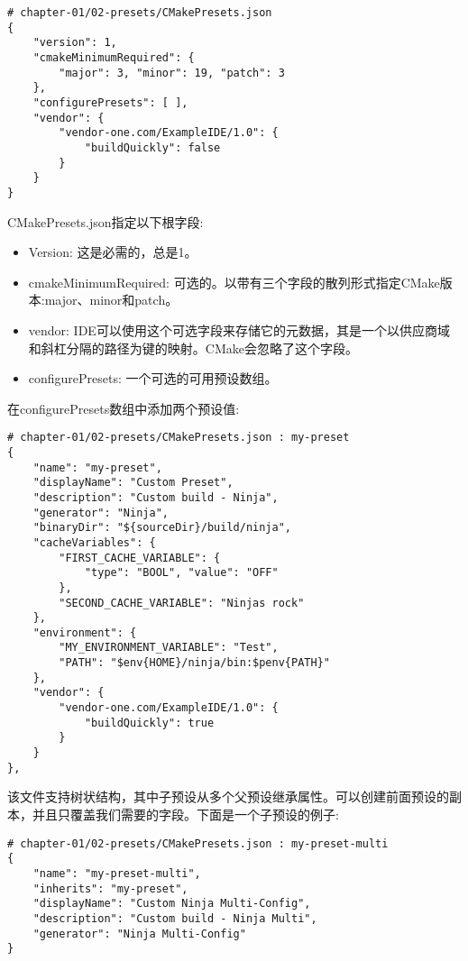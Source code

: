 \begin{lstlisting}[style=styleCMake]
# chapter-01/02-presets/CMakePresets.json
{
	"version": 1,
	"cmakeMinimumRequired": {
		"major": 3, "minor": 19, "patch": 3
	},
	"configurePresets": [ ],
	"vendor": {
		"vendor-one.com/ExampleIDE/1.0": {
			"buildQuickly": false
		}
	}
}
\end{lstlisting}

CMakePresets.json指定以下根字段:

\begin{itemize}
\item 
Version: 这是必需的，总是1。

\item 
cmakeMinimumRequired: 可选的。以带有三个字段的散列形式指定CMake版本:major、minor和patch。

\item 
vendor: IDE可以使用这个可选字段来存储它的元数据，其是一个以供应商域和斜杠分隔的路径为键的映射。CMake会忽略了这个字段。

\item 
configurePresets: 一个可选的可用预设数组。
\end{itemize}

在configurePresets数组中添加两个预设值:

\begin{lstlisting}[style=styleCMake]
# chapter-01/02-presets/CMakePresets.json : my-preset
{
	"name": "my-preset",
	"displayName": "Custom Preset",
	"description": "Custom build - Ninja",
	"generator": "Ninja",
	"binaryDir": "${sourceDir}/build/ninja",
	"cacheVariables": {
		"FIRST_CACHE_VARIABLE": {
			"type": "BOOL", "value": "OFF"
		},
		"SECOND_CACHE_VARIABLE": "Ninjas rock"
	},
	"environment": {
		"MY_ENVIRONMENT_VARIABLE": "Test",
		"PATH": "$env{HOME}/ninja/bin:$penv{PATH}"
	},
	"vendor": {
		"vendor-one.com/ExampleIDE/1.0": {
			"buildQuickly": true
		}
	}
},
\end{lstlisting}

该文件支持树状结构，其中子预设从多个父预设继承属性。可以创建前面预设的副本，并且只覆盖我们需要的字段。下面是一个子预设的例子:

\begin{lstlisting}[style=styleCMake]
# chapter-01/02-presets/CMakePresets.json : my-preset-multi
{
	"name": "my-preset-multi",
	"inherits": "my-preset",
	"displayName": "Custom Ninja Multi-Config",
	"description": "Custom build - Ninja Multi",
	"generator": "Ninja Multi-Config"
}
\end{lstlisting}

